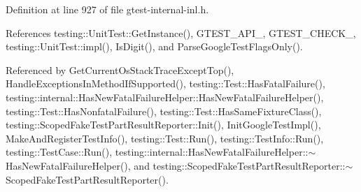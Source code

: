 Definition at line 927 of file gtest-\/internal-\/inl.\+h.



References testing\+::\+Unit\+Test\+::\+Get\+Instance(), G\+T\+E\+S\+T\+\_\+\+A\+P\+I\+\_\+, G\+T\+E\+S\+T\+\_\+\+C\+H\+E\+C\+K\+\_\+, testing\+::\+Unit\+Test\+::impl(), Is\+Digit(), and Parse\+Google\+Test\+Flags\+Only().



Referenced by Get\+Current\+Os\+Stack\+Trace\+Except\+Top(), Handle\+Exceptions\+In\+Method\+If\+Supported(), testing\+::\+Test\+::\+Has\+Fatal\+Failure(), testing\+::internal\+::\+Has\+New\+Fatal\+Failure\+Helper\+::\+Has\+New\+Fatal\+Failure\+Helper(), testing\+::\+Test\+::\+Has\+Nonfatal\+Failure(), testing\+::\+Test\+::\+Has\+Same\+Fixture\+Class(), testing\+::\+Scoped\+Fake\+Test\+Part\+Result\+Reporter\+::\+Init(), Init\+Google\+Test\+Impl(), Make\+And\+Register\+Test\+Info(), testing\+::\+Test\+::\+Run(), testing\+::\+Test\+Info\+::\+Run(), testing\+::\+Test\+Case\+::\+Run(), testing\+::internal\+::\+Has\+New\+Fatal\+Failure\+Helper\+::$\sim$\+Has\+New\+Fatal\+Failure\+Helper(), and testing\+::\+Scoped\+Fake\+Test\+Part\+Result\+Reporter\+::$\sim$\+Scoped\+Fake\+Test\+Part\+Result\+Reporter().


